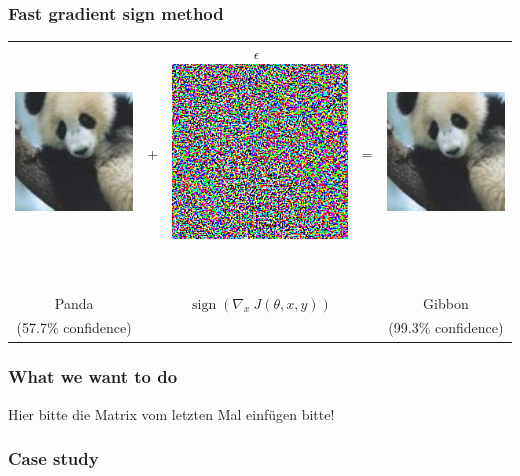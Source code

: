 \documentclass[10pt,usepdftitle=false,aspectratio=169]{beamer}
\begin{document}
\begin{frame}
	\frametitle{Fast gradient sign method}
	\begin{tabular}{ccccc}
		\includegraphics[align=c,width=0.28\columnwidth]{plots/panda_577.png} & \Huge{+} & \Huge{\textbf{$\epsilon$}}\ \includegraphics[align=c,width=0.28\columnwidth]{plots/nematode_082.png}\ & \Huge{=} & \includegraphics[align=c,width=0.28\columnwidth]{plots/gibbon_993.png} \\~\\
		\huge{Panda} &&\qquad \large{$\operatorname{sign}(\nabla_x\ J(\theta,x,y))$}&& \huge{Gibbon} \\
		(57.7\% confidence) &&&& (99.3\% confidence) 
	\end{tabular}
\end{frame}

\begin{frame}[fragile]
	\frametitle{What we want to do}
	Hier bitte die Matrix vom letzten Mal einfügen bitte!	
\end{frame}

\begin{frame}[fragile]
	\frametitle{Case study}
	
\end{frame}
\end{document}
